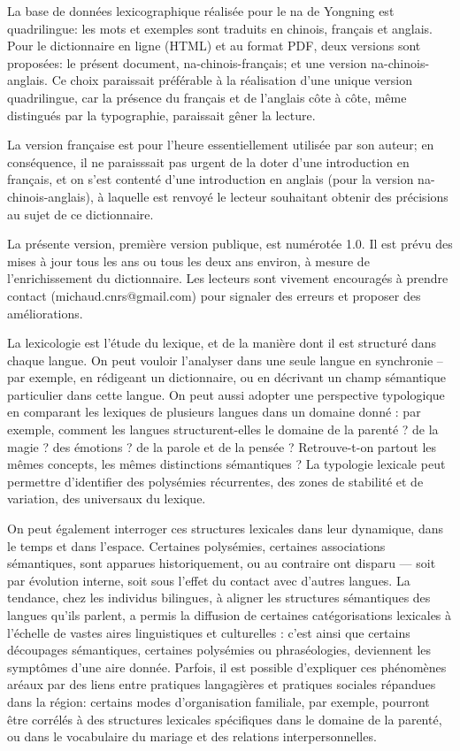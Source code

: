 La base de données lexicographique réalisée pour le na de Yongning est quadrilingue: les mots et exemples sont traduits en chinois, français et anglais. Pour le dictionnaire en ligne (HTML) et au format PDF, deux versions sont proposées: le présent document, na-chinois-français; et une version na-chinois-anglais. Ce choix paraissait préférable à la réalisation d'une unique version quadrilingue, car la présence du français et de l'anglais côte à côte, même distingués par la typographie, paraissait gêner la lecture.

La version française est pour l'heure essentiellement utilisée par son auteur; en conséquence, il ne paraisssait pas urgent de la doter d'une introduction en français, et on s'est contenté d'une introduction en anglais (pour la version na-chinois-anglais), à laquelle est renvoyé le lecteur souhaitant obtenir des précisions au sujet de ce dictionnaire. 

La présente version, première version publique, est numérotée 1.0. Il est prévu des mises à jour tous les ans ou tous les deux ans environ, à mesure de l'enrichissement du dictionnaire. Les lecteurs sont vivement encouragés à prendre contact (michaud.cnrs@gmail.com) pour signaler des erreurs et proposer des améliorations.

    La lexicologie est l'étude du lexique, et de la manière dont il est structuré dans chaque langue.  On peut vouloir l'analyser dans une seule langue en synchronie – par exemple, en rédigeant un dictionnaire, ou en décrivant un champ sémantique particulier dans cette langue. On peut aussi adopter une perspective typologique en comparant les lexiques de plusieurs langues dans un domaine donné : par exemple, comment les langues structurent-elles le domaine de la parenté ? de la magie ? des émotions ? de la parole et de la pensée ? Retrouve-t-on partout les mêmes concepts, les mêmes distinctions sémantiques ? La typologie lexicale peut permettre d’identifier des polysémies récurrentes, des zones de stabilité et de variation, des universaux du lexique.
    
    
    
    On peut également interroger ces structures lexicales dans leur dynamique, dans le temps et dans l'espace. Certaines polysémies, certaines associations sémantiques, sont apparues historiquement, ou au contraire ont disparu — soit par évolution interne, soit sous l'effet du contact avec d'autres langues. La tendance, chez les individus bilingues, à aligner les structures sémantiques des langues qu'ils parlent, a permis la diffusion de certaines catégorisations lexicales à l'échelle de vastes aires linguistiques et culturelles : c'est ainsi que certains découpages sémantiques, certaines polysémies ou phraséologies, deviennent les symptômes d’une aire donnée. Parfois, il est possible d'expliquer ces phénomènes aréaux par des liens entre pratiques langagières et pratiques sociales répandues dans la région: certains modes d’organisation familiale, par exemple, pourront être corrélés à des structures lexicales spécifiques dans le domaine de la parenté, ou dans le vocabulaire du mariage et des relations interpersonnelles.
    
